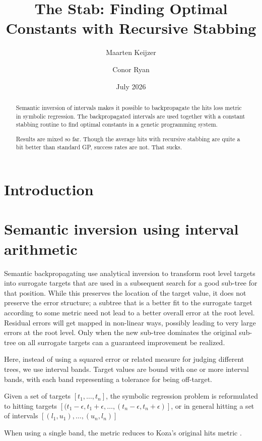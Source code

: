 \documentclass{llncs}
\title{The Stab: Finding Optimal Constants with Recursive Stabbing}
\author{Maarten Keijzer \and Conor Ryan}
\institute{}
\date{July 2026}
\begin{document}
\maketitle

\begin{abstract}
Semantic inversion of intervals makes it possible to backpropagate the hits loss metric in symbolic regression. The backpropagated intervals are used together with a constant stabbing routine to find optimal constants in a genetic programming system.

Results are mixed so far. Though the average hits with recursive stabbing are quite a bit better than standard GP, success rates are not. That sucks.
\end{abstract}

\section{Introduction}

\section{Semantic inversion using interval arithmetic}

Semantic backpropagating \cite{krawiec} use analytical inversion to transform root level targets into surrogate targets that are used in a subsequent search for a good sub-tree for that position. While this preserves the location of the target value, it does not preserve the error structure; a subtree that is a better fit to the surrogate target according to some metric need not lead to a better overall error at the root level. Residual errors will get mapped in non-linear ways, possibly leading to very large errors at the root level. Only when the new sub-tree dominates the original sub-tree on all surrogate targets can a guaranteed improvement be realized. 

Here, instead of using a squared error or related measure for judging different trees, we use interval bands. Target values are bound with one or more interval bands, with each band representing a tolerance for being off-target.  

Given a set of targets $[t_1, \ldots, t_n]$, the symbolic regression problem is reformulated to hitting targets $[(t_1 - \epsilon, t_1 + \epsilon, \ldots, (t_n - \epsilon, t_n + \epsilon) ]$, or in general hitting a set of intervals $[(l_1, u_1), \ldots, (u_n, l_n)]$ 

When using a single band, the metric reduces to Koza's original hits metric \cite{jaws1}.
\end{document}
